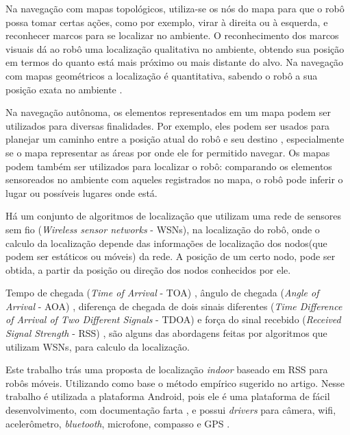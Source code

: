 	Na navegação com mapas topológicos, utiliza-se os nós do mapa para que o robô possa tomar certas ações, como por
exemplo, virar à direita ou à esquerda, e reconhecer marcos para se localizar no ambiente. 
O reconhecimento dos marcos visuais dá ao robô uma localização qualitativa no ambiente,
obtendo sua posição em termos do quanto está mais próximo ou mais distante do alvo. Na
navegação com mapas geométricos a localização é quantitativa, sabendo o robô a sua posição
exata no ambiente \cite{construcaoMapas}.

	Na navegação autônoma, os elementos representados em um mapa podem ser utilizados para diversas finalidades. Por exemplo,
eles podem ser usados para planejar um caminho entre a posição atual do robô e seu
destino \cite{cnn}, especialmente se o mapa representar as áreas por onde ele for permitido navegar. Os mapas podem também ser
utilizados para localizar o robô: comparando os elementos sensoreados no ambiente com aqueles registrados no mapa, o robô pode
inferir o lugar ou possíveis lugares onde está.
	
	Há um conjunto de algoritmos de localização que utilizam uma rede de sensores sem fio (\textit{Wireless sensor networks} - WSNs), 
	na localização do robô, 
	onde o calculo da localização depende das informações de localização dos nodos(que podem ser estáticos ou móveis) da rede\cite{omc}.
	A posição de um certo nodo, pode ser obtida, a partir da posição ou direção dos nodos conhecidos por ele.%
	
	Tempo de chegada (\textit{Time of Arrival} - TOA) \cite{gps}, ângulo de chegada (\textit{Angle of Arrival} - AOA) \cite{aoa}, 
	diferença de chegada de dois sinais diferentes (\textit{Time Difference of Arrival of Two Different Signals} - TDOA) \cite{tdoa} 
	e força do sinal recebido (\textit{Received Signal Strength} - RSS) \cite{wifiRadar}, são alguns das abordagens feitas por algoritmos que utilizam WSNs,
	para calculo da localização.
	
	Este trabalho trás uma proposta de localização \textit{indoor} baseado em RSS para robôs móveis.
	Utilizando como base o método empírico sugerido no artigo\cite{wifiRadar}. Nesse trabalho
	é utilizada a plataforma Android, pois ele \cite{androidSite} é uma plataforma de fácil desenvolvimento, 
	com documentação farta \cite{androidDev}, e possui \textit{drivers} para câmera, wifi, acelerômetro, 
	\textit{bluetooth}, microfone, compasso e GPS \cite{androidRobot}. 
  
